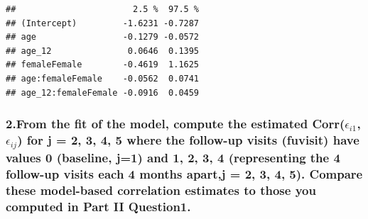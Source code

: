 \documentclass[
]{article}
\newenvironment{Shaded}{\begin{snugshade}}{\end{snugshade}}
\newcommand{\CommentTok}[1]{\textcolor[rgb]{0.56,0.35,0.01}{\textit{#1}}}
\begin{document}
\begin{verbatim}
##                       2.5 %  97.5 %
## (Intercept)         -1.6231 -0.7287
## age                 -0.1279 -0.0572
## age_12               0.0646  0.1395
## femaleFemale        -0.4619  1.1625
## age:femaleFemale    -0.0562  0.0741
## age_12:femaleFemale -0.0916  0.0459
\end{verbatim}

\begin{Shaded}
\end{Shaded}

\hypertarget{from-the-fit-of-the-model-compute-the-estimated-correpsilon_i1-epsilon_ij-for-j-2-3-4-5-where-the-follow-up-visits-fuvisit-have-values-0-baseline-j1-and-1-2-3-4-representing-the-4-follow-up-visits-each-4-months-apartj-2-3-4-5.-compare-these-model-based-correlation-estimates-to-those-you-computed-in-part-ii-question1.}{%
\subsubsection{\texorpdfstring{2.From the fit of the model, compute the
estimated Corr(\(\epsilon_{i1}\), \(\epsilon_{ij}\)) for j = 2, 3, 4, 5
where the follow-up visits (fuvisit) have values 0 (baseline, j=1) and
1, 2, 3, 4 (representing the 4 follow-up visits each 4 months apart,j =
2, 3, 4, 5). Compare these model-based correlation estimates to those
you computed in Part II
Question1.}{2.From the fit of the model, compute the estimated Corr(\textbackslash epsilon\_\{i1\}, \textbackslash epsilon\_\{ij\}) for j = 2, 3, 4, 5 where the follow-up visits (fuvisit) have values 0 (baseline, j=1) and 1, 2, 3, 4 (representing the 4 follow-up visits each 4 months apart,j = 2, 3, 4, 5). Compare these model-based correlation estimates to those you computed in Part II Question1.}}\label{from-the-fit-of-the-model-compute-the-estimated-correpsilon_i1-epsilon_ij-for-j-2-3-4-5-where-the-follow-up-visits-fuvisit-have-values-0-baseline-j1-and-1-2-3-4-representing-the-4-follow-up-visits-each-4-months-apartj-2-3-4-5.-compare-these-model-based-correlation-estimates-to-those-you-computed-in-part-ii-question1.}}
\end{document}
